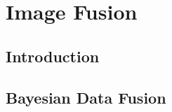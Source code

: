\chapter{Image Fusion }
\section{Introduction}

\section{Bayesian Data Fusion}\label{secBayesian}



